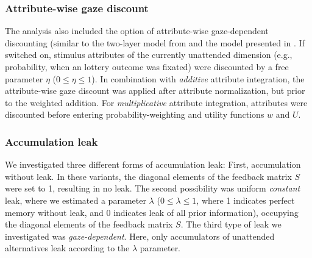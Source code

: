 \documentclass[11pt, a4paper]{article}
\begin{document}
\subsubsection*{Attribute-wise gaze discount}
The analysis also included the option of attribute-wise gaze-dependent discounting (similar to the two-layer model from \parencite{glickman2019FormationPreferenceRisky} and the model presented in \parencite{fisher2017AttentionalDriftDiffusion}. If switched on, stimulus attributes of the currently unattended dimension (e.g., probability, when an lottery outcome was fixated) were discounted by a free parameter $\eta$ ($0 \le \eta \le 1$). In combination with \emph{additive} attribute integration, the attribute-wise gaze discount was applied after attribute normalization, but prior to the weighted addition. For \emph{multiplicative} attribute integration, attributes were discounted before entering probability-weighting and utility functions $w$ and $U$.

\subsubsection*{Accumulation leak}
We investigated three different forms of accumulation leak: First, accumulation without leak. In these variants, the diagonal elements of the feedback matrix $S$ were set to 1, resulting in no leak. The second possibility was uniform \emph{constant} leak, where we estimated a parameter $\lambda$ ($0 \le \lambda \le 1$, where 1 indicates perfect memory without leak, and 0 indicates leak of all prior information), occupying the diagonal elements of the feedback matrix $S$.
The third type of leak we investigated was \emph{gaze-dependent}. Here, only accumulators of unattended alternatives leak according to the $\lambda$ parameter.
\end{document}
